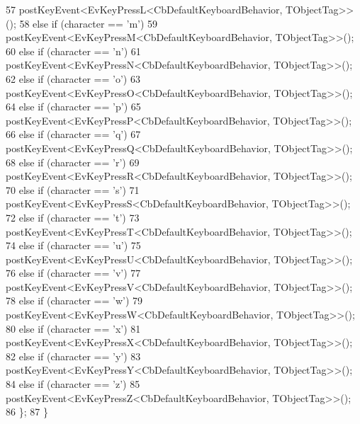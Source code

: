 \begin{DoxyCode}
57                 postKeyEvent<EvKeyPressL<CbDefaultKeyboardBehavior, TObjectTag>>();
58             \textcolor{keywordflow}{else} \textcolor{keywordflow}{if} (character == \textcolor{charliteral}{'m'})
59                 postKeyEvent<EvKeyPressM<CbDefaultKeyboardBehavior, TObjectTag>>();
60             \textcolor{keywordflow}{else} \textcolor{keywordflow}{if} (character == \textcolor{charliteral}{'n'})
61                 postKeyEvent<EvKeyPressN<CbDefaultKeyboardBehavior, TObjectTag>>();
62             \textcolor{keywordflow}{else} \textcolor{keywordflow}{if} (character == \textcolor{charliteral}{'o'})
63                 postKeyEvent<EvKeyPressO<CbDefaultKeyboardBehavior, TObjectTag>>();
64             \textcolor{keywordflow}{else} \textcolor{keywordflow}{if} (character == \textcolor{charliteral}{'p'})
65                 postKeyEvent<EvKeyPressP<CbDefaultKeyboardBehavior, TObjectTag>>();
66             \textcolor{keywordflow}{else} \textcolor{keywordflow}{if} (character == \textcolor{charliteral}{'q'})
67                 postKeyEvent<EvKeyPressQ<CbDefaultKeyboardBehavior, TObjectTag>>();
68             \textcolor{keywordflow}{else} \textcolor{keywordflow}{if} (character == \textcolor{charliteral}{'r'})
69                 postKeyEvent<EvKeyPressR<CbDefaultKeyboardBehavior, TObjectTag>>();
70             \textcolor{keywordflow}{else} \textcolor{keywordflow}{if} (character == \textcolor{charliteral}{'s'})
71                 postKeyEvent<EvKeyPressS<CbDefaultKeyboardBehavior, TObjectTag>>();
72             \textcolor{keywordflow}{else} \textcolor{keywordflow}{if} (character == \textcolor{charliteral}{'t'})
73                 postKeyEvent<EvKeyPressT<CbDefaultKeyboardBehavior, TObjectTag>>();
74             \textcolor{keywordflow}{else} \textcolor{keywordflow}{if} (character == \textcolor{charliteral}{'u'})
75                 postKeyEvent<EvKeyPressU<CbDefaultKeyboardBehavior, TObjectTag>>();
76             \textcolor{keywordflow}{else} \textcolor{keywordflow}{if} (character == \textcolor{charliteral}{'v'})
77                 postKeyEvent<EvKeyPressV<CbDefaultKeyboardBehavior, TObjectTag>>();
78             \textcolor{keywordflow}{else} \textcolor{keywordflow}{if} (character == \textcolor{charliteral}{'w'})
79                 postKeyEvent<EvKeyPressW<CbDefaultKeyboardBehavior, TObjectTag>>();
80             \textcolor{keywordflow}{else} \textcolor{keywordflow}{if} (character == \textcolor{charliteral}{'x'})
81                 postKeyEvent<EvKeyPressX<CbDefaultKeyboardBehavior, TObjectTag>>();
82             \textcolor{keywordflow}{else} \textcolor{keywordflow}{if} (character == \textcolor{charliteral}{'y'})
83                 postKeyEvent<EvKeyPressY<CbDefaultKeyboardBehavior, TObjectTag>>();
84             \textcolor{keywordflow}{else} \textcolor{keywordflow}{if} (character == \textcolor{charliteral}{'z'})
85                 postKeyEvent<EvKeyPressZ<CbDefaultKeyboardBehavior, TObjectTag>>();
86         \};
87     \}
\end{DoxyCode}
